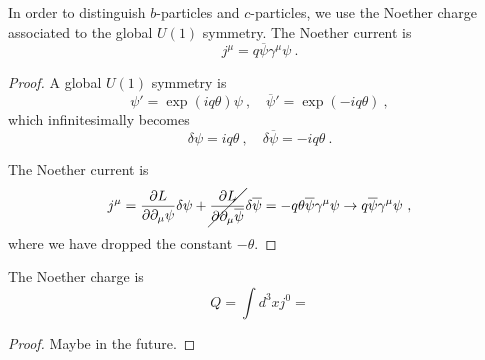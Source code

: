     In order to distinguish $b$-particles and $c$-particles, we use the Noether charge associated to the global $U(1)$ symmetry. The Noether current is 
    \begin{equation*}
        j^\mu = q \overline \psi \gamma^\mu \psi ~.
    \end{equation*}
    \begin{proof}
        A global $U(1)$ symmetry is 
        \begin{equation*}
            \psi' = \exp(i q \theta) \psi ~, \quad \overline \psi' = \exp(- i q \theta) ~,
        \end{equation*}
        which infinitesimally becomes
        \begin{equation*}
            \delta \psi = i q \theta ~, \quad \delta \overline \psi = - i q \theta ~.
        \end{equation*}

        The Noether current is 
        \begin{equation*}
            j^\mu = \frac{\partial L}{\partial\partial_\mu \psi} \delta \psi + \cancel{\frac{\partial L}{\partial\partial_\mu \overline \psi}} \delta \overline \psi = - q \theta \overline \psi \gamma^\mu \psi \rightarrow q \overline \psi \gamma^\mu \psi ~,
        \end{equation*}
        where we have dropped the constant $- \theta$.
    \end{proof}

    The Noether charge is 
    \begin{equation*}
        Q = \int d^3 x j^0 = 
    \end{equation*}
    \begin{proof}
        Maybe in the future.
    \end{proof}

